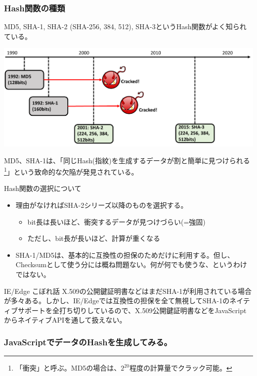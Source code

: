 \documentclass[12pt,dvipdfmx]{beamer}
\begin{document}
\begin{frame}
\frametitle{Hash関数の種類}
 MD5, SHA-1, SHA-2 (SHA-256, 384, 512), SHA-3というHash関数がよく知られている。
 \begin{center}
  \includegraphics[width=\linewidth]{Figs/hash-history.pdf}
 \end{center}
 MD5、SHA-1は、「\alert{同じHash(指紋)を生成するデータが割と簡単に見つけられる}\footnote[frame]{「衝突」と呼ぶ。MD5の場合は、$2^{20}$程度の計算量でクラック可能。}」という致命的な欠陥が発見されている。
\end{frame}

\begin{frame}
\begin{block}{\small Hash関数の選択について}
\begin{itemize}
 \item 理由がなければSHA-2シリーズ以降のものを選択する。
\begin{itemize}
 \item bit長は長いほど、衝突するデータが見つけづらい(=強固)
 \item ただし、bit長が長いほど、計算が重くなる
\end{itemize}
 \item SHA-1/MD5は、基本的に互換性の担保のためだけに利用する。但し、Checksumとして使う分には概ね問題ない。\alert{何が何でも使うな、というわけではない。}
\end{itemize}
\end{block}

\begin{exampleblock}{\small IE/Edge こぼれ話}
\small
X.509の公開鍵証明書などはまだSHA-1が利用されている場合が多々ある。しかし、\alert{IE/Edgeでは互換性の担保を全て無視してSHA-1のネイティブサポートを全打ち切り}しているので、X.509公開鍵証明書などをJavaScriptからネイティブAPIを通して扱えない。
\end{exampleblock}
\end{frame}

\begin{frame}
\frametitle{JavaScriptでデータのHashを生成してみる。}
\end{frame}
\end{document}
